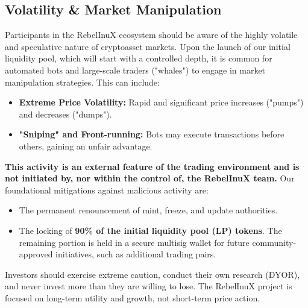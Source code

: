 \documentclass{article}
\begin{document}
\begin{tcolorbox}[colback=red!5!white, colframe=red!75!black, title=\textbf{\large WARNING: Important Market Considerations \& Risks}, fonttitle=\bfseries, arc=3mm]



\subsection*{Volatility \& Market Manipulation}
Participants in the RebelInuX ecosystem should be aware of the highly volatile and speculative nature of cryptoasset markets. Upon the launch of our initial liquidity pool, which will start with a controlled depth, it is common for automated bots and large-scale traders ("whales") to engage in market manipulation strategies. This can include:

\begin{itemize}
    \item \textbf{Extreme Price Volatility:} Rapid and significant price increases ("pumps") and decreases ("dumps").
    \item \textbf{"Sniping" and Front-running:} Bots may execute transactions before others, gaining an unfair advantage.
\end{itemize}

\noindent
\textbf{This activity is an external feature of the trading environment and is not initiated by, nor within the control of, the RebelInuX team.} Our foundational mitigations against malicious activity are:

\begin{itemize}
    \item The permanent renouncement of mint, freeze, and update authorities.
    \item The locking of \textbf{90\% of the initial liquidity pool (LP) tokens}. The remaining portion is held in a secure multisig wallet for future community-approved initiatives, such as additional trading pairs.
\end{itemize}

\noindent
Investors should exercise extreme caution, conduct their own research (DYOR), and never invest more than they are willing to lose. The RebelInuX project is focused on long-term utility and growth, not short-term price action.
\end{tcolorbox}
\end{document}
